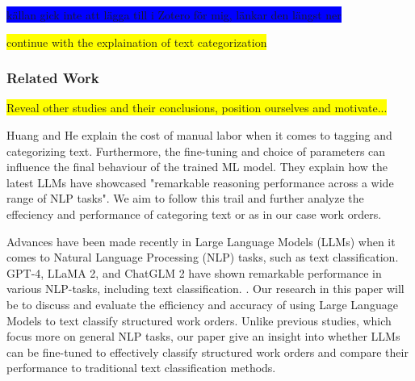 \documentclass{article}
\begin{document}
\colorbox{blue}{källan gick inte att lägga till i Zotero för mig, länkar den längst ner}
\bigskip

\colorbox{yellow}{continue with the explaination of text categorization}

\subsubsection{Related Work}
\colorbox{yellow}{Reveal other studies and their conclusions, position ourselves and motivate...}






Huang and He \cite{huang2024} explain the cost of manual labor when it comes to tagging and categorizing text.
Furthermore, the fine-tuning and choice of parameters can influence the final behaviour of the trained
ML model.
They explain how the latest LLMs have showcased "remarkable reasoning performance across a wide range of
NLP tasks".
We aim to follow this trail and further analyze the effeciency and performance of categoring text or as in our
case work orders.
\bigskip

Advances have been made recently in Large Language Models (LLMs) when it comes to Natural Language Processing (NLP) tasks,
such as text classification.
GPT-4, LLaMA 2, and ChatGLM 2 have shown remarkable performance in various NLP-tasks, including text classification.
\cite{zhang2024}.
Our research in this paper will be to discuss and evaluate the efficiency and accuracy of using Large Language Models
to text classify structured work orders. Unlike previous studies, which focus more on general NLP tasks,
our paper give an insight into whether LLMs can be fine-tuned to effectively classify structured work orders and compare their
performance to traditional text classification methods.
\bigskip
\end{document}
